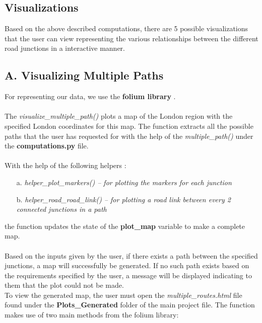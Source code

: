 \documentclass[fontsize=11pt]{IEEEtran}
\begin{document}
\begin{enumerate}
\section{Visualizations}

Based on the above described computations, there are 5 possible visualizations that the user can view representing the various relationships between the different road junctions in a interactive manner.
\subsection*{A. Visualizing Multiple Paths}
For representing our data, we use the \textbf{folium library} \cite{7}. \\ \\
The \textit{visualize\_multiple\_path()} plots a map of the London region with the specified London coordinates for this map. The function extracts all the possible paths that the user has requested for with the help of the \textit{multiple\_path()} under the \textbf{computations.py} file. \\ \\
With the help of the following helpers :
\begin{enumerate}
    \item[a.] \textit{helper\_plot\_markers() -- for plotting the markers for each junction}\\
    \item[b.] \textit{helper\_road\_road\_link() -- for plotting a road link between every 2 connected junctions in a path} \\
\end{enumerate}
 the function updates the state of the \textbf{plot\_map} variable to make a complete map. \\ \\
Based on the inputs given by the user, if there exists a path between the specified junctions, a map will successfully be generated. If no such path exists based on the requirements specified by the user, a message will be displayed indicating to them that the plot could not be made. \\
To view the generated map, the user must open the \textit{multiple\_routes.html} file found under the \textbf{Plots\_Generated} folder of the main project file.
\newpage
 The function makes use of two main methods from the folium library:


\end{enumerate}
\end{document}
